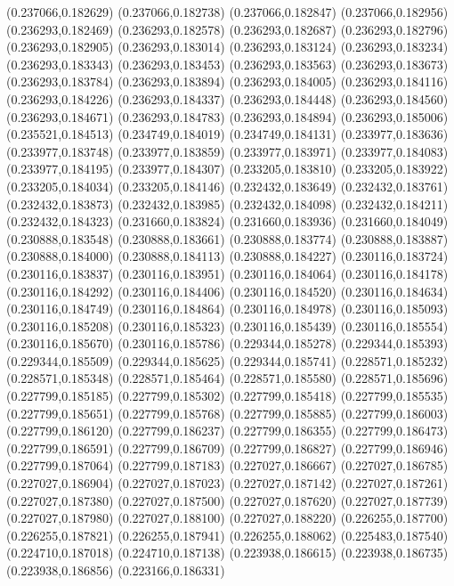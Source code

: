 (0.237066,0.182629)
(0.237066,0.182738)
(0.237066,0.182847)
(0.237066,0.182956)
(0.236293,0.182469)
(0.236293,0.182578)
(0.236293,0.182687)
(0.236293,0.182796)
(0.236293,0.182905)
(0.236293,0.183014)
(0.236293,0.183124)
(0.236293,0.183234)
(0.236293,0.183343)
(0.236293,0.183453)
(0.236293,0.183563)
(0.236293,0.183673)
(0.236293,0.183784)
(0.236293,0.183894)
(0.236293,0.184005)
(0.236293,0.184116)
(0.236293,0.184226)
(0.236293,0.184337)
(0.236293,0.184448)
(0.236293,0.184560)
(0.236293,0.184671)
(0.236293,0.184783)
(0.236293,0.184894)
(0.236293,0.185006)
(0.235521,0.184513)
(0.234749,0.184019)
(0.234749,0.184131)
(0.233977,0.183636)
(0.233977,0.183748)
(0.233977,0.183859)
(0.233977,0.183971)
(0.233977,0.184083)
(0.233977,0.184195)
(0.233977,0.184307)
(0.233205,0.183810)
(0.233205,0.183922)
(0.233205,0.184034)
(0.233205,0.184146)
(0.232432,0.183649)
(0.232432,0.183761)
(0.232432,0.183873)
(0.232432,0.183985)
(0.232432,0.184098)
(0.232432,0.184211)
(0.232432,0.184323)
(0.231660,0.183824)
(0.231660,0.183936)
(0.231660,0.184049)
(0.230888,0.183548)
(0.230888,0.183661)
(0.230888,0.183774)
(0.230888,0.183887)
(0.230888,0.184000)
(0.230888,0.184113)
(0.230888,0.184227)
(0.230116,0.183724)
(0.230116,0.183837)
(0.230116,0.183951)
(0.230116,0.184064)
(0.230116,0.184178)
(0.230116,0.184292)
(0.230116,0.184406)
(0.230116,0.184520)
(0.230116,0.184634)
(0.230116,0.184749)
(0.230116,0.184864)
(0.230116,0.184978)
(0.230116,0.185093)
(0.230116,0.185208)
(0.230116,0.185323)
(0.230116,0.185439)
(0.230116,0.185554)
(0.230116,0.185670)
(0.230116,0.185786)
(0.229344,0.185278)
(0.229344,0.185393)
(0.229344,0.185509)
(0.229344,0.185625)
(0.229344,0.185741)
(0.228571,0.185232)
(0.228571,0.185348)
(0.228571,0.185464)
(0.228571,0.185580)
(0.228571,0.185696)
(0.227799,0.185185)
(0.227799,0.185302)
(0.227799,0.185418)
(0.227799,0.185535)
(0.227799,0.185651)
(0.227799,0.185768)
(0.227799,0.185885)
(0.227799,0.186003)
(0.227799,0.186120)
(0.227799,0.186237)
(0.227799,0.186355)
(0.227799,0.186473)
(0.227799,0.186591)
(0.227799,0.186709)
(0.227799,0.186827)
(0.227799,0.186946)
(0.227799,0.187064)
(0.227799,0.187183)
(0.227027,0.186667)
(0.227027,0.186785)
(0.227027,0.186904)
(0.227027,0.187023)
(0.227027,0.187142)
(0.227027,0.187261)
(0.227027,0.187380)
(0.227027,0.187500)
(0.227027,0.187620)
(0.227027,0.187739)
(0.227027,0.187980)
(0.227027,0.188100)
(0.227027,0.188220)
(0.226255,0.187700)
(0.226255,0.187821)
(0.226255,0.187941)
(0.226255,0.188062)
(0.225483,0.187540)
(0.224710,0.187018)
(0.224710,0.187138)
(0.223938,0.186615)
(0.223938,0.186735)
(0.223938,0.186856)
(0.223166,0.186331)
